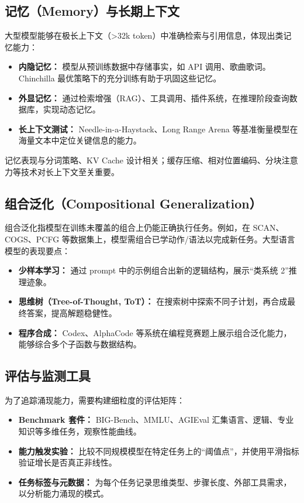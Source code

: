 \documentclass[UTF8,zihao=-4]{ctexart}
\begin{document}
\subsection{记忆（Memory）与长期上下文}
大型模型能够在极长上下文（>32k token）中准确检索与引用信息，体现出类记忆能力：
\begin{itemize}
  \item \textbf{内隐记忆：} 模型从预训练数据中存储事实，如 API 调用、歌曲歌词。Chinchilla 最优策略下的充分训练有助于巩固这些记忆。
  \item \textbf{外显记忆：} 通过检索增强（RAG）、工具调用、插件系统，在推理阶段查询数据库，实现动态记忆。
  \item \textbf{长上下文测试：} Needle-in-a-Haystack、Long Range Arena 等基准衡量模型在海量文本中定位关键信息的能力。
\end{itemize}
记忆表现与分词策略、KV Cache 设计相关；缓存压缩、相对位置编码、分块注意力等技术对长上下文至关重要。

\subsection{组合泛化（Compositional Generalization）}
组合泛化指模型在训练未覆盖的组合上仍能正确执行任务。例如，在 SCAN、COGS、PCFG 等数据集上，模型需组合已学动作/语法以完成新任务。大型语言模型的表现要点：
\begin{itemize}
  \item \textbf{少样本学习：} 通过 prompt 中的示例组合出新的逻辑结构，展示“类系统 2”推理迹象。
  \item \textbf{思维树（Tree-of-Thought, ToT）：} 在搜索树中探索不同子计划，再合成最终答案，提高解题稳健性。
  \item \textbf{程序合成：} Codex、AlphaCode 等系统在编程竞赛题上展示组合泛化能力，能够综合多个子函数与数据结构。
\end{itemize}

\subsection{评估与监测工具}
为了追踪涌现能力，需要构建细粒度的评估矩阵：
\begin{itemize}
  \item \textbf{Benchmark 套件：} BIG-Bench、MMLU、AGIEval 汇集语言、逻辑、专业知识等多维任务，观察性能曲线。
  \item \textbf{能力触发实验：} 比较不同规模模型在特定任务上的“阈值点”，并使用平滑指标验证增长是否真正非线性。
  \item \textbf{任务标签与元数据：} 为每个任务记录思维类型、步骤长度、外部工具需求，以分析能力涌现的模式。
\end{itemize}
\end{document}
